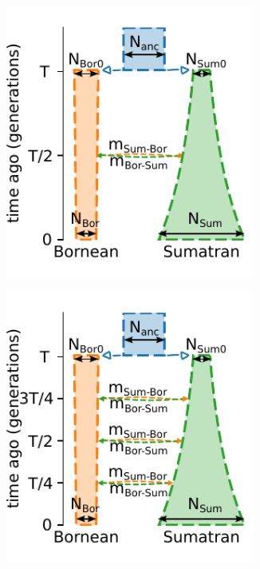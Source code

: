 \begin{figure}[ht!]
\begin{subfigure}[b]{0.33\linewidth}
        \caption{}
        \label{fig:experiments:sim_2:oran_struct_mig}
    \end{subfigure}
    \begin{subfigure}[b]{0.33\linewidth}
        \centering
        \includegraphics[width=0.9\textwidth]{images_experiments/suimulation_2_stdpopsim/picture_ORAN_PULSE_1.pdf}
        \caption{}
        \label{fig:experiments:sim_2:oran_pulse_1}
    \end{subfigure}%
    \begin{subfigure}[b]{0.33\linewidth}
        \centering
        \includegraphics[width=0.9\textwidth]{images_experiments/suimulation_2_stdpopsim/picture_ORAN_PULSE_3.pdf}

\end{subfigure}
\end{figure}
